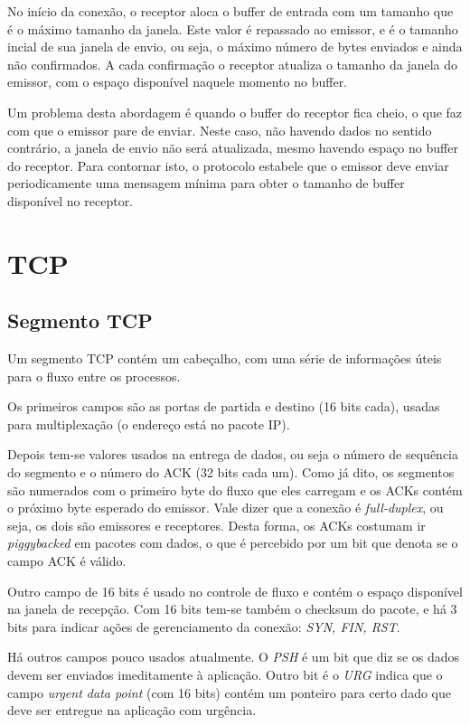 No início da conexão, o receptor aloca o buffer de entrada com um tamanho que é o máximo tamanho da janela.
Este valor é repassado ao emissor, e é o tamanho incial de sua janela de envio, ou seja, o máximo número de bytes enviados e ainda não confirmados.
A cada confirmação o receptor atualiza o tamanho da janela do emissor, com o espaço disponível naquele momento no buffer.

Um problema desta abordagem é quando o buffer do receptor fica cheio, o que faz com que o emissor pare de enviar.
Neste caso, não havendo dados no sentido contrário, a janela de envio não será atualizada, mesmo havendo espaço no buffer do receptor.
Para contornar isto, o protocolo estabele que o emissor deve enviar periodicamente uma mensagem mínima para obter o tamanho de buffer disponível no receptor.

\section{TCP}

\subsection{Segmento TCP}

Um segmento TCP contém um cabeçalho, com uma série de informações úteis para o fluxo entre os processos.

Os primeiros campos são as portas de partida e destino (16 bits cada), usadas para multiplexação (o endereço está no pacote IP).

Depois tem-se valores usados na entrega de dados, ou seja o número de sequência do segmento e o número do ACK (32 bits cada um).
Como já dito, os segmentos são numerados com o primeiro byte do fluxo que eles carregam e os ACKs contém o próximo byte esperado do emissor.
Vale dizer que a conexão é \emph{full-duplex}, ou seja, os dois são emissores e receptores.
Desta forma, os ACKs costumam ir \emph{piggybacked} em pacotes com dados, o que é percebido por um bit que denota se o campo ACK é válido.

Outro campo de 16 bits é usado no controle de fluxo e contém o espaço disponível na janela de recepção.
Com 16 bits tem-se também o checksum do pacote, e há 3 bits para indicar ações de gerenciamento da conexão: \emph{SYN, FIN, RST}.

Há outros campos pouco usados atualmente.
O \emph{PSH} é um bit que diz se os dados devem ser enviados imeditamente à aplicação.
Outro bit é o \emph{URG} indica que o campo \emph{urgent data point} (com 16 bits) contém um ponteiro para certo dado que deve ser entregue na aplicação com urgência.

